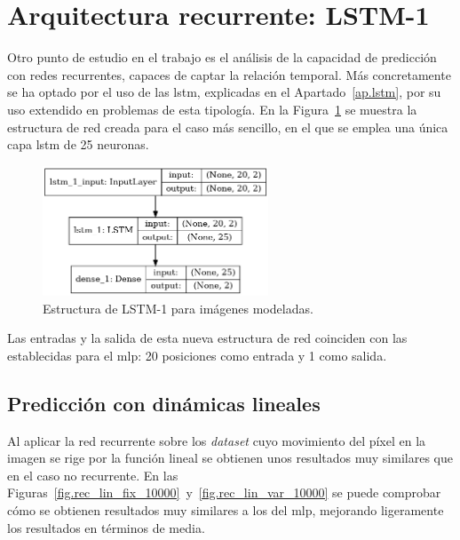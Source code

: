 \section{Arquitectura recurrente: LSTM-1}
Otro punto de estudio en el trabajo es el análisis de la capacidad de predicción con redes recurrentes, capaces de captar la relación temporal. Más concretamente se ha optado por el uso de las \acrshort{lstm}, explicadas en el Apartado~\ref{ap.lstm}, por su uso extendido en problemas de esta tipología. En la Figura~\ref{fig.rec_simple_mod} se muestra la estructura de red creada para el caso más sencillo, en el que se emplea una única capa \acrshort{lstm} de 25 neuronas.
\vspace{10pt}
\begin{figure}[H]
		\begin{center}
			\includegraphics[width=0.6\textwidth]{ figures/net/REC_simple_mod.png}
			\caption{Estructura de LSTM-1 para imágenes modeladas.}
			\label{fig.rec_simple_mod}
		\end{center}
\end{figure}
\vspace{-10pt}

Las entradas y la salida de esta nueva estructura de red coinciden con las establecidas para el \acrshort{mlp}: 20 posiciones como entrada y 1 como salida.

\subsection{Predicción con dinámicas lineales}
Al aplicar la red recurrente sobre los \textit{dataset} cuyo movimiento del píxel en la imagen se rige por la función lineal se obtienen unos resultados muy similares que en el caso no recurrente. En las Figuras~\ref{fig.rec_lin_fix_10000}~y~\ref{fig.rec_lin_var_10000} se puede comprobar cómo se obtienen resultados muy similares a los del \acrshort{mlp}, mejorando ligeramente los resultados en términos de media.\\

